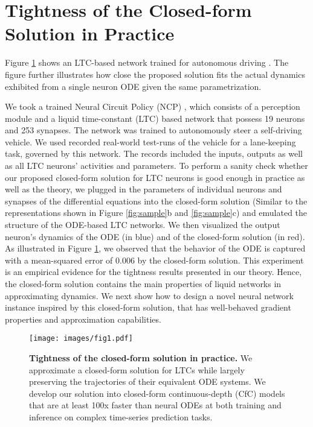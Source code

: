 \documentclass[12pt]{article}
\begin{document}
\section*{Tightness of the Closed-form Solution in Practice}
Figure \ref{fig:intro} shows an LTC-based network trained for autonomous driving \cite{lechner2020neural}. The figure further illustrates how close the proposed solution fits the actual dynamics exhibited from a single neuron ODE given the same parametrization. 

We took a trained Neural Circuit Policy (NCP)  \cite{lechner2020neural}, which consists of a perception module and a liquid time-constant (LTC) based network  \cite{hasani2021liquid} that possess 19 neurons and 253 synapses. The network was trained to autonomously steer a self-driving vehicle. We used recorded real-world test-runs of the vehicle for a lane-keeping task, governed by this network. The records included the inputs, outputs as well as all
LTC neurons’ activities and parameters. To perform a sanity check whether our proposed closed-form solution for LTC neurons is good enough in practice as well as the theory, we plugged in the parameters of individual neurons and synapses of the differential equations into the closed-form solution (Similar to the representations shown in Figure \ref{fig:sample}b and \ref{fig:sample}c) and emulated the structure of the ODE-based LTC networks. We then visualized the output neuron’s dynamics of the ODE (in blue) and of the closed-form
solution (in red). As illustrated in Figure \ref{fig:intro}, we observed that the behavior of the ODE is captured with a mean-squared error of 0.006 by the closed-form solution. This experiment is an empirical evidence for the tightness results presented in our theory. Hence, the closed-form solution contains the main properties of liquid networks in approximating dynamics. We next show how to design a novel neural network instance inspired by this closed-form solution, that has well-behaved gradient properties and approximation capabilities.



\begin{figure}[t]
	\centering
	\texttt{[image: images/fig1.pdf]}
	\caption{\textbf{Tightness of the closed-form solution in practice.} We approximate a closed-form solution for LTCs \cite{hasani2021liquid} while largely preserving the trajectories of their equivalent ODE systems. We develop our solution into closed-form continuous-depth (CfC) models that are at least 100x faster than neural ODEs at both training and inference on complex time-series prediction tasks.}
	\label{fig:intro}
\end{figure}
\end{document}
